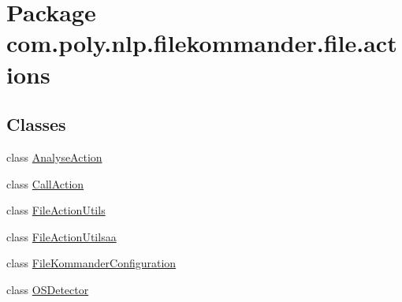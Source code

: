 \hypertarget{namespacecom_1_1poly_1_1nlp_1_1filekommander_1_1file_1_1actions}{\section{Package com.\-poly.\-nlp.\-filekommander.\-file.\-actions}
\label{namespacecom_1_1poly_1_1nlp_1_1filekommander_1_1file_1_1actions}
}
\subsection*{Classes}
\begin{DoxyCompactItemize}
\item 
class \hyperlink{classcom_1_1poly_1_1nlp_1_1filekommander_1_1file_1_1actions_1_1_analyse_action}{Analyse\-Action}
\item 
class \hyperlink{classcom_1_1poly_1_1nlp_1_1filekommander_1_1file_1_1actions_1_1_call_action}{Call\-Action}
\item 
class \hyperlink{classcom_1_1poly_1_1nlp_1_1filekommander_1_1file_1_1actions_1_1_file_action_utils}{File\-Action\-Utils}
\item 
class \hyperlink{classcom_1_1poly_1_1nlp_1_1filekommander_1_1file_1_1actions_1_1_file_action_utilsaa}{File\-Action\-Utilsaa}
\item 
class \hyperlink{classcom_1_1poly_1_1nlp_1_1filekommander_1_1file_1_1actions_1_1_file_kommander_configuration}{File\-Kommander\-Configuration}
\item 
class \hyperlink{classcom_1_1poly_1_1nlp_1_1filekommander_1_1file_1_1actions_1_1_o_s_detector}{O\-S\-Detector}
\end{DoxyCompactItemize}
